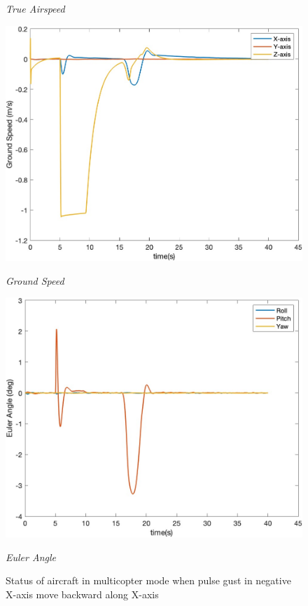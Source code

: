 \begin{figure}[htbp]
\begin{minipage}[b]{0.45\textwidth}
    \caption*{\textit{True Airspeed}}
  \end{minipage}
  \begin{minipage}[b]{0.45\textwidth}
    \centering
    \includegraphics[width=\textwidth]{Images/Gust/VTOL pulse/3 groundspeed_1.jpg}
    \caption*{\textit{Ground Speed}}
  \end{minipage}
  \hfil
  \begin{minipage}[b]{0.45\textwidth}
    \centering
    \includegraphics[width=\textwidth]{Images/Gust/VTOL pulse/4 EulerAngle_1.jpg}
    \caption*{\textit{Euler Angle}}
  \end{minipage}
  \caption{Status of aircraft in multicopter mode when pulse gust in negative X-axis move backward along X-axis}
  \label{fig:VTOL pulse -x}
\end{figure}

